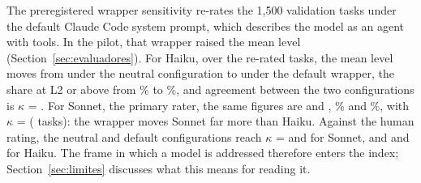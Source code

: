 The preregistered wrapper sensitivity re-rates the 1,500 validation tasks under the default Claude Code system prompt, which describes the model as an agent with tools.
In the pilot, that wrapper raised the mean level (Section~\ref{sec:evaluadores}).
For Haiku, over the  re-rated tasks, the mean level moves from  under the neutral configuration to  under the default wrapper, the share at L2 or above from \% to \%, and agreement between the two configurations is $\kappa$ = .
For Sonnet, the primary rater, the same figures are  and , \% and \%, with $\kappa$ =  ( tasks): the wrapper moves Sonnet far more than Haiku.
Against the human rating, the neutral and default configurations reach $\kappa$ =  and  for Sonnet, and  and  for Haiku.
The frame in which a model is addressed therefore enters the index; Section~\ref{sec:limites} discusses what this means for reading it.
